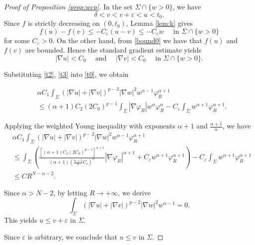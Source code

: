 \documentclass[reqno]{amsart}
\theoremstyle{plain}
\theoremstyle{definition}
\theoremstyle{remark}
\begin{document}
\begin{proof}[Proof of Proposition \ref{prop:wcp}]
		In the set ${\Sigma}\cap\{w > 0\}$, we have
		\begin{equation}\label{bound0}
			\delta < v < v+\varepsilon < u < t_0.
		\end{equation}
		Since $f$ is strictly decreasing on $(0,t_0)$, Lemma \ref{lem:k} gives
		\begin{equation}\label{t2}
			f(u) - f(v) \le - C_\varepsilon (u-v) \le - C_\varepsilon w \quad\text{ in } {\Sigma}\cap\{w > 0\}
		\end{equation}
		for some $C_\varepsilon>0$.
		On the other hand, from \eqref{bound0} we have that $f(u)$ and $f(v)$ are bounded. Hence the standard gradient estimate yields
		\begin{equation}\label{t3}
			|\nabla u| < C_0 \quad\text{ and }\quad |\nabla v| < C_0 \quad\text{ in } {\Sigma}\cap\{w > 0\}.
		\end{equation}
		
		Substituting \eqref{t2}, \eqref{t3} into \eqref{t0}, we obtain
		
		\begin{align*}
			&\alpha C_1 \int_{\Sigma} (|\nabla u| + |\nabla v|)^{p-2} |\nabla w|^2 w^{\alpha-1} \varphi_R^{\alpha+1}\\
			&\le (\alpha+1)C_2(2C_0)^{p-1} \int_{\Sigma} |\nabla \varphi_R| w^{\alpha} \varphi_R^\alpha - C_\varepsilon \int_{\Sigma} w^{\alpha+1} \varphi_R^{\alpha+1}.
		\end{align*}
		
		Applying the weighted Young inequality with exponents $\alpha+1$ and $\frac{\alpha+1}{\alpha}$, we have
		\begin{align*}
			&\alpha C_1 \int_{\Sigma} (|\nabla u| + |\nabla v|)^{p-2} |\nabla w|^2 w^{\alpha-1} \varphi_R^{\alpha+1}\\
			&\le \int_{\Sigma} \left(\frac{[(\alpha+1)C_2(2C_0)^{p-1}]^{\alpha+1}}{(\alpha+1)(\frac{\alpha+1}{\alpha} C_\varepsilon)^\alpha} |\nabla \varphi_R|^{\alpha+1} + C_\varepsilon w^{\alpha+1} \varphi_R^{\alpha+1}\right) - C_\varepsilon \int_{\Sigma} w^{\alpha+1} \varphi_R^{\alpha+1}\\
			&\le C R^{N-\alpha-2}.
		\end{align*}
		
		Since $\alpha>N-2$, by letting $R\to+\infty$, we derive
		\[
		\int_{\Sigma} (|\nabla u| + |\nabla v|)^{p-2} |\nabla w|^2 w^{\alpha-1} = 0.
		\]
		This yields $u \le v + \varepsilon$ in ${\Sigma}$.
		
		Since $\varepsilon$ is arbitrary, we conclude that $u\le v$ in $\Sigma$.
	\end{proof}
	
\end{document}
